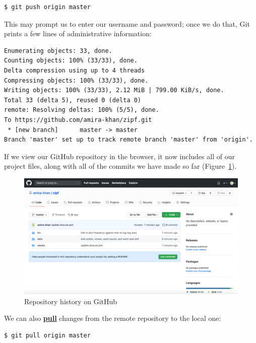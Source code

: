 \documentclass[
]{krantz}
\newcommand{\gref}[2]{\hyperlink{#2}{\textbf{#1}}}
\begin{document}
\begin{verbatim}
$ git push origin master
\end{verbatim}

This may prompt us to enter our username and password;
once we do that,
Git prints a few lines of administrative information:

\begin{verbatim}
Enumerating objects: 33, done.
Counting objects: 100% (33/33), done.
Delta compression using up to 4 threads
Compressing objects: 100% (33/33), done.
Writing objects: 100% (33/33), 2.12 MiB | 799.00 KiB/s, done.
Total 33 (delta 5), reused 0 (delta 0)
remote: Resolving deltas: 100% (5/5), done.
To https://github.com/amira-khan/zipf.git
 * [new branch]      master -> master
Branch 'master' set up to track remote branch 'master' from 'origin'.
\end{verbatim}

If we view our GitHub repository in the browser,
it now includes all of our project files,
along with all of the commits we have made so far (Figure~\ref{fig:git-cmdline-history}).

\begin{figure}

{\centering \includegraphics[width=1\linewidth]{figures/git-cmdline/repo-history} 

}

\caption{Repository history on GitHub}\label{fig:git-cmdline-history}
\end{figure}

We can also \gref{pull}{git\_pull} changes
from the remote repository to the local one:

\begin{verbatim}
$ git pull origin master
\end{verbatim}
\end{document}
